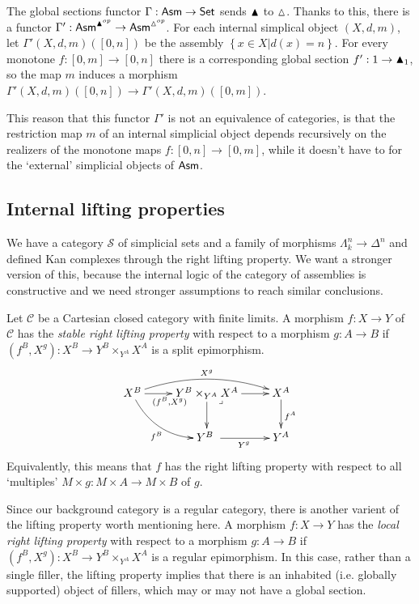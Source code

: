 \documentclass{amsart}
\theoremstyle{plain}
\theoremstyle{definition}
\newcommand\hide[1]{}
\newcommand\cat\mathcal
\newcommand\set[1]{\left\{#1\right\}}
\begin{document}
The global sections functor $\Gamma:\mathsf{Asm}\to\mathsf{Set}$ sends $\blacktriangle$ to $\vartriangle$. Thanks to this, there is a functor $\Gamma':\mathsf{Asm}^{\blacktriangle^{op}} \to \mathsf{Asm}^{\vartriangle^{op}}$. For each internal simplical object $(X,d,m)$, let $\Gamma'(X,d,m)([0,n])$ be the assembly $\set{x\in X|d(x)=n}$. For every monotone $f:[0,m]\to [0,n]$ there is a corresponding global section $f':1\to \blacktriangle_1$, so the map $m$ induces a morphism $\Gamma'(X,d,m)([0,n]) \to \Gamma'(X,d,m)([0,m])$.

This reason that this functor $\Gamma'$ is not an equivalence of categories, is that the restriction map $m$ of an internal simplicial object depends recursively on the realizers of the monotone maps $f:[0,n]\to [0,m]$, while it doesn't have to for the `external' simplicial objects of $\mathsf{Asm}$. \hide{tegenvoorbeeld?}

\subsection{Internal lifting properties}
We have a category $\cat S$ of simplicial sets and a family of morphisms $\Lambda^n_k\to\Delta^n$ and defined Kan complexes through the right lifting property. We want a stronger version of this, because the internal logic of the category of assemblies is constructive and we need stronger assumptions to reach similar conclusions.

\newcommand\pb{\ar@{}[dr]|<\lrcorner}
Let $\cat C$ be a Cartesian closed category with finite limits. A morphism $f:X\to Y$ of $\cat C$ has the \emph{stable right lifting property} with respect to a morphism $g:A\to B$ if $(f^B,X^g): X^B \to Y^B\times_{Y^A} X^A$ is a split epimorphism.
\[\xymatrix{
X^B\ar@/_3ex/[dr]_{f^B} \ar@/^3ex/[rr]^{X^g} \ar[r]_{(f^B,X^g)}
&Y^B\times_{Y^A} X^A \ar[r]\ar[d]\pb & X^A \ar[d]^{f^A} \\
&Y^B\ \ar[r]_{Y^g} & Y^A \\
}\]
Equivalently, this means that $f$ has the right lifting property with respect to all `multiples' $M\times g:M\times A\to M\times B$ of $g$. 

Since our background category is a regular category, there is another varient of the lifting property worth mentioning here. A morphism $f:X\to Y$ has the \emph{local right lifting property} with respect to a morphism $g:A\to B$ if $(f^B,X^g): X^B \to Y^B\times_{Y^A} X^A$ is a regular epimorphism. In this case, rather than a single filler, the lifting property implies that there is an inhabited (i.e. globally supported) object of fillers, which may or may not have a global section. \hide{misschien uitlichten voor refereren later?}
\end{document}
